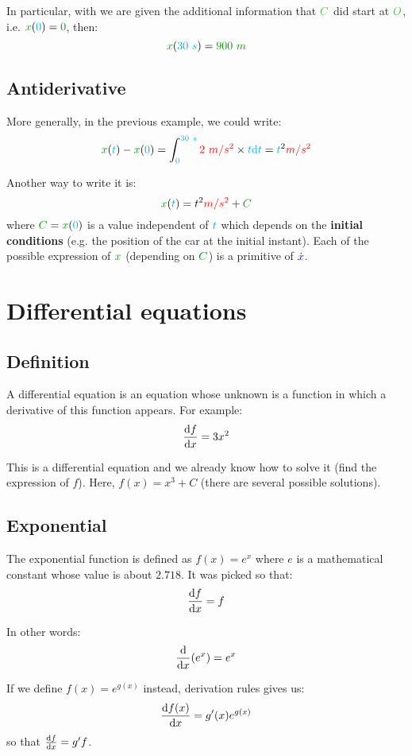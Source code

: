 In particular, with we are given the additional information that $\posit{C}$
did start at $\posit{O}$, i.e.  $\dist{x}(\delay{0}) = \dist{0}$, then:
\[
\dist{x}(\delay{30~s}) = \dist{900~m}
\]


\subsection{Antiderivative}

More generally, in the previous example, we could write:
\[
\dist{x}(\delay{t}) - \dist{x}(\delay{0})
= \int_{\delay{0}}^{\delay{30~s}} \accel{2~m/s^2} \times \delay{t} \delay{\dt}
= \delay{t}^2 \accel{m/s^2}
\]

Another way to write it is:
\[
\dist{x}(\delay{t})
= t^2 \accel{m/s^2} + \dist{C}
\]
where $\dist{C} = \dist{x}(\delay{0})$ is a value independent of
$\textcolor{cyan}{t}$ which depends on the \textbf{initial conditions} (e.g. the
position of the car at the initial instant). Each of the possible
expression of $\dist{x}$ (depending on $\dist{C}$) is a primitive of
$\textcolor{blue}{\dot x}$.



\section{Differential equations}


\subsection{Definition}

A differential equation is an equation whose unknown is a function in
which a derivative of this function appears. For example:
\[
\frac {\mathrm{d} f} {\mathrm{d} x} = 3x^2
\]

This is a differential equation and we already know how to solve it
(find the expression of $f$). Here, $f(x) = x^3 + C$ (there are several
possible solutions).


\subsection{Exponential}

The exponential function is defined as $f(x) = e^x$ where $e$ is a
mathematical constant whose value is about $2.718$. It was picked so that:
\[
\frac {\mathrm{d} f} {\mathrm{d} x} = f
\]

In other words:
\[
\frac {\mathrm{d}} {\mathrm{d} x} (e^x) = e^x
\]

\begin{remark}
If we define $f(x) = e^{g(x)}$ instead, derivation rules
gives us:
\[
\frac {\mathrm{d} f(x)} {\mathrm{d} x}
= g'(x) e^{g(x)}
\]
so that $\frac {\mathrm{d} f} {\mathrm{d} x} = g' f$.
\end{remark}


